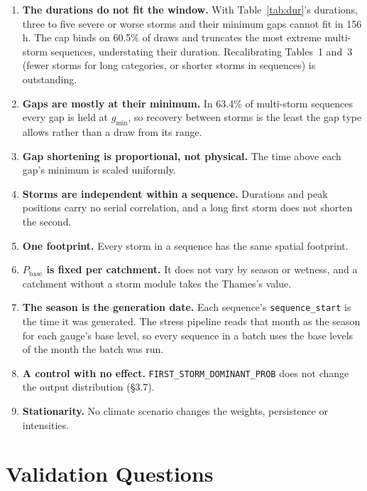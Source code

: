 \documentclass[11pt,a4paper]{article}
\begin{document}
\begin{enumerate}[nosep]
    \item \textbf{The durations do not fit the window.} With Table~\ref{tab:dur}'s
          durations, three to five severe or worse storms and their minimum gaps cannot
          fit in 156\,h. The cap binds on 60.5\% of draws and truncates the most extreme
          multi-storm sequences, understating their duration. Recalibrating Tables~1
          and~3 (fewer storms for long categories, or shorter storms in sequences) is
          outstanding.
    \item \textbf{Gaps are mostly at their minimum.} In 63.4\% of multi-storm sequences
          every gap is held at $g_{\min}$, so recovery between storms is the least the
          gap type allows rather than a draw from its range.
    \item \textbf{Gap shortening is proportional, not physical.} The time above each
          gap's minimum is scaled uniformly.
    \item \textbf{Storms are independent within a sequence.} Durations and peak positions
          carry no serial correlation, and a long first storm does not shorten the second.
    \item \textbf{One footprint.} Every storm in a sequence has the same spatial footprint.
    \item \textbf{$P_{\text{base}}$ is fixed per catchment.} It does not vary by season or
          wetness, and a catchment without a storm module takes the Thames's value.
    \item \textbf{The season is the generation date.} Each sequence's
          \texttt{sequence\_start} is the time it was generated. The stress pipeline reads
          that month as the season for each gauge's base level, so every sequence in a
          batch uses the base levels of the month the batch was run.
    \item \textbf{A control with no effect.} \texttt{FIRST\_STORM\_DOMINANT\_PROB} does not
          change the output distribution (\S3.7).
    \item \textbf{Stationarity.} No climate scenario changes the weights, persistence or
          intensities.
\end{enumerate}

\section{Validation Questions}
\end{document}
